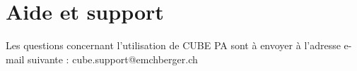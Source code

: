 
\clearpage
\section{Aide et support}
\label{bkm:Ref443502661}

Les questions concernant l'utilisation de CUBE PA sont à envoyer à l'adresse e-mail suivante : {\color{red} cube.support@emchberger.ch}

